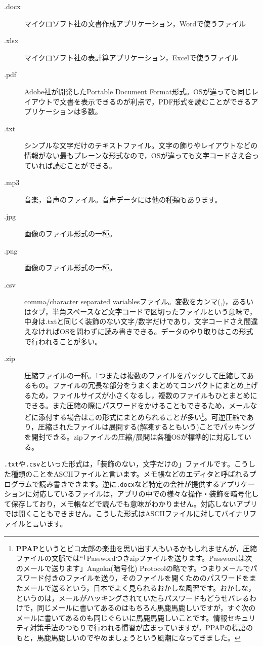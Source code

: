 \documentclass{ltjsbook}
\begin{document}
\begin{description}
	\item[.docx] マイクロソフト社の文書作成アプリケーション，Wordで使うファイル
	\item[.xlsx] マイクロソフト社の表計算アプリケーション，Excelで使うファイル
	\item[.pdf]  Adobe社が開発したPortable Document Format形式。OSが違っても同じレイアウトで文書を表示できるのが利点で，PDF形式を読むことができるアプリケーションは多数。
	\item[.txt] シンプルな文字だけのテキストファイル。文字の飾りやレイアウトなどの情報がない最もプレーンな形式なので，OSが違っても文字コードさえ合っていれば読むことができる。
	\item[.mp3] 音楽，音声のファイル。音声データには他の種類もあります。
	\item[.jpg] 画像のファイル形式の一種。
	\item[.png] 画像のファイル形式の一種。
	\item[.csv]  comma/character separated variablesファイル。変数をカンマ(,)，あるいはタブ，半角スペースなど文字コードで区切ったファイルという意味で，中身は.txtと同じく装飾のない文字/数字だけであり，文字コードさえ間違えなければOSを問わずに読み書きできる。データのやり取りはこの形式で行われることが多い。
	\item[.zip] 圧縮ファイルの一種。1つまたは複数のファイルをパックして圧縮してあるもの。ファイルの冗長な部分をうまくまとめてコンパクトにまとめ上げるため，ファイルサイズが小さくなるし，複数のファイルもひとまとめにできる。また圧縮の際にパスワードをかけることもできるため，メールなどに添付する場合はこの形式にまとめられることが多い\footnote{\textbf{PPAP}というとピコ太郎の楽曲を思い出す人もいるかもしれませんが，圧縮ファイルの文脈では``「Passwordつきzipファイルを送ります。Passwordは次のメールで送ります」Angoka(暗号化) Protocolの略です。つまりメールでパスワード付きのファイルを送り，そのファイルを開くためのパスワードをまたメールで送るという，日本でよく見られるおかしな風習です。おかしな，というのは，メールがハッキングされていたらパスワードもどうせバレるわけで，同じメールに書いてあるのはもちろん馬鹿馬鹿しいですが，すぐ次のメールに書いてあるのも同じぐらいに馬鹿馬鹿しいことです。情報セキュリティ対策手法のつもりで行われる慣習が広まっていますが，PPAPの標語のもと，馬鹿馬鹿しいのでやめましょうという風潮になってきました。}。可逆圧縮であり，圧縮されたファイルは展開する(解凍するともいう)ことでパッキングを開封できる。zipファイルの圧縮/展開は各種OSが標準的に対応している。
\end{description}
\texttt{.txt}や\texttt{.csv}といった形式は，「装飾のない，文字だけの」ファイルです。こうした種類のことをASCIIファイルと言います。メモ帳などのエディタと呼ばれるプログラムで読み書きできます。逆に\texttt{.docx}など特定の会社が提供するアプリケーションに対応しているファイルは，アプリの中での様々な操作・装飾を暗号化して保存しており，メモ帳などで読んでも意味がわかりません。対応しないアプリでは開くこともできません。こうした形式はASCIIファイルに対してバイナリファイルと言います。
\end{document}
